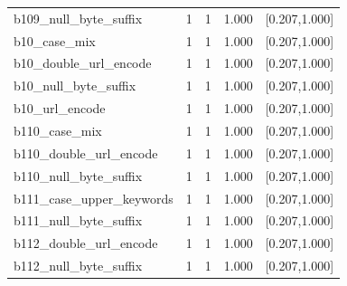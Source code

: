 \begin{table}[t]
\begin{tabular}{lrrrr}
b109\_null\_byte\_suffix & 1 & 1 & 1.000 & [0.207,1.000] \\
b10\_case\_mix & 1 & 1 & 1.000 & [0.207,1.000] \\
b10\_double\_url\_encode & 1 & 1 & 1.000 & [0.207,1.000] \\
b10\_null\_byte\_suffix & 1 & 1 & 1.000 & [0.207,1.000] \\
b10\_url\_encode & 1 & 1 & 1.000 & [0.207,1.000] \\
b110\_case\_mix & 1 & 1 & 1.000 & [0.207,1.000] \\
b110\_double\_url\_encode & 1 & 1 & 1.000 & [0.207,1.000] \\
b110\_null\_byte\_suffix & 1 & 1 & 1.000 & [0.207,1.000] \\
b111\_case\_upper\_keywords & 1 & 1 & 1.000 & [0.207,1.000] \\
b111\_null\_byte\_suffix & 1 & 1 & 1.000 & [0.207,1.000] \\
b112\_double\_url\_encode & 1 & 1 & 1.000 & [0.207,1.000] \\
b112\_null\_byte\_suffix & 1 & 1 & 1.000 & [0.207,1.000] \\
\hline
\end{tabular}
\end{table}
